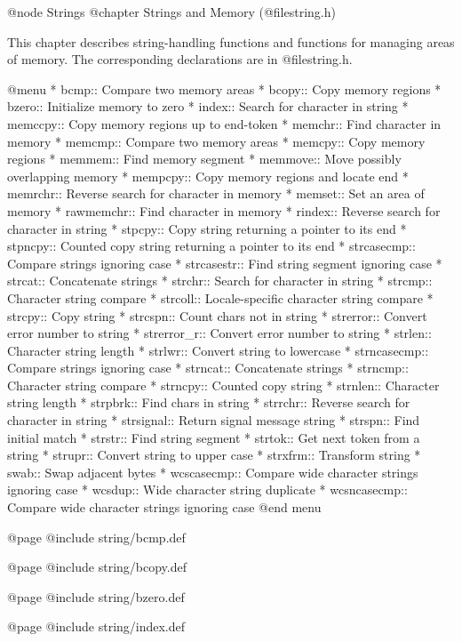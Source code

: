 @node Strings
@chapter Strings and Memory (@file{string.h})

This chapter describes string-handling functions and functions for
managing areas of memory.  The corresponding declarations are in
@file{string.h}.

@menu
* bcmp::        Compare two memory areas
* bcopy::       Copy memory regions
* bzero::       Initialize memory to zero
* index::       Search for character in string
* memccpy::     Copy memory regions up to end-token
* memchr::      Find character in memory
* memcmp::      Compare two memory areas
* memcpy::      Copy memory regions
* memmem::      Find memory segment
* memmove::     Move possibly overlapping memory
* mempcpy::	Copy memory regions and locate end
* memrchr::     Reverse search for character in memory
* memset::      Set an area of memory
* rawmemchr::   Find character in memory
* rindex::      Reverse search for character in string
* stpcpy::      Copy string returning a pointer to its end
* stpncpy::     Counted copy string returning a pointer to its end
* strcasecmp::	Compare strings ignoring case
* strcasestr::	Find string segment ignoring case
* strcat::      Concatenate strings
* strchr::      Search for character in string
* strcmp::      Character string compare
* strcoll::     Locale-specific character string compare
* strcpy::      Copy string
* strcspn::     Count chars not in string
* strerror::    Convert error number to string
* strerror_r::  Convert error number to string
* strlen::      Character string length
* strlwr::	Convert string to lowercase
* strncasecmp::	Compare strings ignoring case
* strncat::     Concatenate strings
* strncmp::     Character string compare
* strncpy::     Counted copy string
* strnlen::     Character string length
* strpbrk::     Find chars in string
* strrchr::     Reverse search for character in string
* strsignal::	Return signal message string
* strspn::      Find initial match
* strstr::      Find string segment
* strtok::      Get next token from a string
* strupr::	Convert string to upper case
* strxfrm::     Transform string
* swab::        Swap adjacent bytes
* wcscasecmp::  Compare wide character strings ignoring case
* wcsdup::      Wide character string duplicate
* wcsncasecmp:: Compare wide character strings ignoring case
@end menu

@page
@include string/bcmp.def

@page
@include string/bcopy.def

@page
@include string/bzero.def

@page
@include string/index.def

